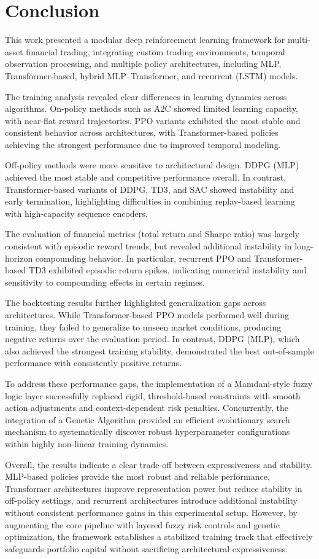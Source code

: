\section{Conclusion}

This work presented a modular deep reinforcement learning framework 
for multi-asset financial trading, integrating custom trading environments, 
temporal observation processing, and multiple policy architectures, 
including MLP, Transformer-based, hybrid MLP--Transformer, and 
recurrent (LSTM) models.

The training analysis revealed clear differences in learning dynamics across 
algorithms. On-policy methods such as A2C showed limited learning capacity, 
with near-flat reward trajectories. PPO variants exhibited the most stable 
and consistent behavior across architectures, with Transformer-based policies 
achieving the strongest performance due to improved temporal modeling.

Off-policy methods were more sensitive to architectural design. DDPG (MLP) 
achieved the most stable and competitive performance overall. In contrast, 
Transformer-based variants of DDPG, TD3, and SAC showed instability and 
early termination, highlighting difficulties in combining replay-based 
learning with high-capacity sequence encoders.

The evaluation of financial metrics (total return and Sharpe ratio) was 
largely consistent with episodic reward trends, but revealed additional 
instability in long-horizon compounding behavior. In particular, 
recurrent PPO and Transformer-based TD3 exhibited episodic return spikes, 
indicating numerical instability and sensitivity to compounding effects in 
certain regimes.

The backtesting results further highlighted generalization gaps across 
architectures. While Transformer-based PPO models performed well during 
training, they failed to generalize to unseen market conditions, producing 
negative returns over the evaluation period. In contrast, DDPG (MLP), which
also achieved the strongest training stability, demonstrated the best 
out-of-sample performance with consistently positive returns.

To address these performance gaps, the implementation of a Mamdani-style fuzzy 
logic layer successfully replaced rigid, threshold-based constraints with smooth 
action adjustments and context-dependent risk penalties. Concurrently, the 
integration of a Genetic Algorithm provided an efficient evolutionary search 
mechanism to systematically discover robust hyperparameter configurations within 
highly non-linear training dynamics.

Overall, the results indicate a clear trade-off between expressiveness and 
stability. MLP-based policies provide the most robust and reliable performance, 
Transformer architectures improve representation power but reduce stability 
in off-policy settings, and recurrent architectures introduce additional 
instability without consistent performance gains in this experimental setup. 
However, by augmenting the core pipeline with layered fuzzy risk controls and genetic 
optimization, the framework establishes a stabilized training track that effectively 
safeguards portfolio capital without sacrificing architectural expressiveness.